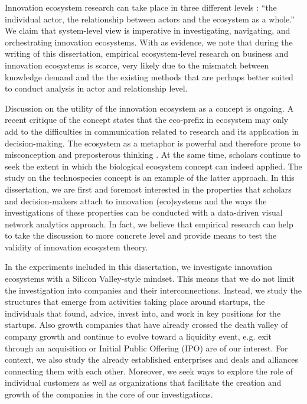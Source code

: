 Innovation ecosystem research can take place in three different levels \citep{Jarvi2016TakingReview}: ``the individual actor, the relationship between actors and the ecosystem as a whole.'' We claim that system-level view is imperative in investigating, navigating, and orchestrating innovation ecosystems. With \cite{Jarvi2016TakingReview} as evidence, we note that during the writing of this dissertation, empirical ecosystem-level research on business and innovation ecosystems is scarce, very likely due to the mismatch between knowledge demand and the the existing methods that are perhaps better suited to conduct analysis in actor and relationship level.

Discussion on the utility of the innovation ecosystem as a concept is ongoing. A recent critique of the concept \citep{OhInnovationExamination} states that the eco-prefix in ecosystem may only add to the difficulties in communication related to research and its application in decision-making. The ecosystem as a metaphor is powerful and therefore prone to misconception and preposterous thinking \citep{OhInnovationExamination}. At the same time, scholars continue to seek the extent in which the biological ecosystem concept can indeed applied. The study on the technospecies concept \citep{Weber2015WhoConcept} is an example of the latter approach. In this dissertation, we are first and foremost interested in the properties that scholars and decision-makers attach to innovation (eco)systems and the ways the investigations of these properties can be conducted with a data-driven visual network analytics approach. In fact, we believe that empirical research can help to take the discussion to more concrete level and provide means to test the validity of innovation ecosystem theory. 

In the experiments included in this dissertation, we investigate innovation ecosystems with a Silicon Valley-style mindset. This means that we do not limit the investigation into companies and their interconnections. Instead, we study the structures that emerge from activities taking place around startups, the individuals that found, advice, invest into, and work in key positions for the startups. Also growth companies that have already crossed the death valley of company growth and continue to evolve toward a liquidity event, e.g. exit through an acquisition or Initial Public Offering (IPO) are of our interest. For context, we also study the already established enterprises and deals and alliances connecting them with each other. Moreover, we seek ways to explore the role of individual customers as well as organizations that facilitate the creation and growth of the companies in the core of our investigations.

